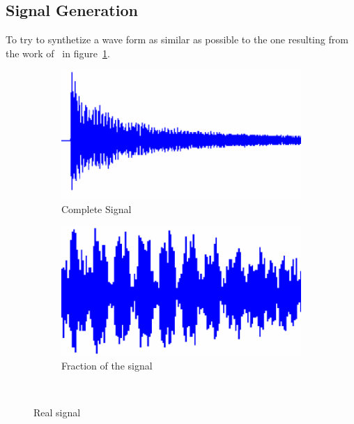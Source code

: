 \subsection{Signal Generation}\label{subsec:sigGen}
To try to synthetize a wave form as similar as possible to the one resulting from the work of~\citeauthor{wuLiquidLevelDetector2014b} in figure~\ref{fig:realsignalWu}.
\begin{figure}[]
    \centering
    \begin{subfigure}{0.45\textwidth}
        \centering
        \includegraphics[width=\linewidth]{Chapters/6CHP/Figures/completesignalWu.pdf}
        \caption{Complete Signal}{}
    \end{subfigure}
    \begin{subfigure}{0.45\textwidth}
        \centering
        \includegraphics[width=\linewidth]{Chapters/6CHP/Figures/fractionWu.pdf}
        \caption{Fraction of the signal}{}
    \end{subfigure}
    \caption{Real signal}{~\cite{wuLiquidLevelDetector2014b}}
     \label{fig:realsignalWu}
 \end{figure}
